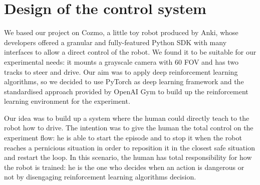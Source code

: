 \documentclass[10pt,twocolumn,letterpaper]{article}
\begin{document}

\section{Design of the control system}

We based our project on Cozmo, a little toy robot produced by Anki, whose developers offered a granular and fully-featured Python SDK with many interfaces to allow a direct control of the robot.
We found it to be suitable for our experimental needs: it mounts a grayscale camera with 60 FOV and has two tracks to steer and drive.
Our aim was to apply deep reinforcement learning algorithms, so we decided to use PyTorch as deep learning framework and the standardised approach provided by OpenAI Gym to build up the reinforcement learning environment for the experiment.

Our idea was to build up a system where the human could directly teach to the robot how to drive.
The intention was to give the human the total control on the experiment flow: he is able to start the episode and to stop it when the robot reaches a pernicious situation in order to reposition it in the closest safe situation and restart the loop. In this scenario, the human has total responsibility for how the robot is trained: he is the one who decides when an action is dangerous or not by disengaging reinforcement learning algorithms decision.
\end{document}
